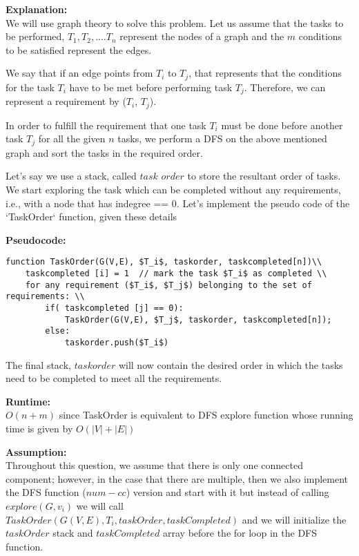 \documentclass[letterpaper,11pt]{article}
\newcounter{problemid}\stepcounter{problemid}
\def\newproblem{\vspace*{0.5cm}{\bf Problem~\arabic{problemid}\stepcounter{problemid}}\hfill\fbox{\parbox{0.16\textwidth}{\bf Points:}}\par}
\begin{document}
\newproblem
{\bf Explanation: }\\
We will use graph theory to solve this problem. Let us assume that the tasks to be performed, ${T_1, T_2, ....T_n}$ represent the nodes of a graph and the $m$ conditions to be satisfied represent the edges. 

We say that if an edge points from $T_i$ to $T_j$, that represents that the conditions for the task $T_i$ have to be met before performing task $T_j$. Therefore, we can represent a requirement by ($T_i$, $T_j$). 

In order to fulfill the requirement that one task $T_i$ must be done before another task $T_j$ for all the given $n$ tasks, we perform a DFS on the above mentioned graph and sort the tasks in the required order. 

Let's say we use a stack, called $task$ $order$ to store the resultant order of tasks. We start exploring the task which can be completed without any requirements, i.e., with a node that has indegree == 0. Let's implement the pseudo code of the  `TaskOrder` function, given these details

{\bf Pseudocode: }
\begin{Verbatim}[commandchars=\\\{\},codes={\catcode`$=3\catcode`_=8}]
function TaskOrder(G(V,E), $T_i$, taskorder, taskcompleted[n])\\
    taskcompleted [i] = 1  // mark the task $T_i$ as completed \\
    for any requirement ($T_i$, $T_j$) belonging to the set of requirements: \\
        if( taskcompleted [j] == 0): 
            TaskOrder(G(V,E), $T_j$, taskorder, taskcompleted[n]);  
        else: 
            taskorder.push($T_i$) 
\end{Verbatim} 

The final stack, $taskorder$ will now contain the desired order in which the tasks need to be completed to meet all the requirements.

{\bf Runtime: } \\
$O(n+m)$ since TaskOrder is equivalent to DFS explore function whose running time is given by $O(|V|+|E|)$

{\bf Assumption: } \\
Throughout this question, we assume that there is only one connected component; however, in the case that there are multiple, then we also implement the DFS function ($num-cc$) version and start with it but instead of calling $explore(G,v_i)$ we will call $TaskOrder(G(V,E), T_i, taskOrder, taskCompleted)$ and we will initialize the $taskOrder$ stack and $taskCompleted$ array before the for loop in the DFS function.
\end{document}
